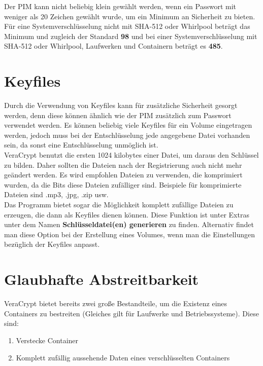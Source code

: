 \documentclass[12pt,a4paper]{scrreprt}
\begin{document}
\noindent Der PIM kann nicht beliebig klein gewählt werden, wenn ein Passwort mit weniger als 20 Zeichen gewählt wurde, um ein Minimum an Sicherheit zu bieten. Für eine Systemverschlüsselung nicht mit SHA-512 oder Whirlpool beträgt das Minimum und zugleich der Standard \textbf{98} und bei einer Systemverschlüsselung mit SHA-512 oder Whirlpool, Laufwerken und Containern beträgt es \textbf{485}.

\section{Keyfiles}
Durch die Verwendung von Keyfiles kann für zusätzliche Sicherheit gesorgt werden, denn diese können ähnlich wie der PIM zusätzlich zum Passwort verwendet werden. Es können beliebig viele Keyfiles für ein Volume eingetragen werden, jedoch muss bei der Entschlüsselung jede angegebene Datei vorhanden sein, da sonst eine Entschlüsselung unmöglich ist. \\

\noindent VeraCrypt benutzt die ersten 1024 kilobytes einer Datei, um daraus den Schlüssel zu bilden. Daher sollten die Dateien nach der Registrierung auch nicht mehr geändert werden. Es wird empfohlen Dateien zu verwenden, die komprimiert wurden, da die Bits diese Dateien zufälliger sind. Beispiele für komprimierte Dateien sind .mp3, .jpg, .zip usw. \\

\noindent Das Programm bietet sogar die Möglichkeit komplett zufällige Dateien zu erzeugen, die dann als Keyfiles dienen können. Diese Funktion ist unter Extras unter dem Namen \textbf{Schlüsseldatei(en) generieren} zu finden. Alternativ findet man diese Option bei der Erstellung eines Volumes, wenn man die Einstellungen bezüglich der Keyfiles anpasst.

\section{Glaubhafte Abstreitbarkeit}
VeraCrypt bietet bereits zwei große Bestandteile, um die Existenz eines Containers zu bestreiten (Gleiches gilt für Laufwerke und Betriebssysteme). Diese sind:

\begin{enumerate}
\item Verstecke Container
\item Komplett zufällig aussehende Daten eines verschlüsselten Containers
\end{enumerate}
\end{document}
